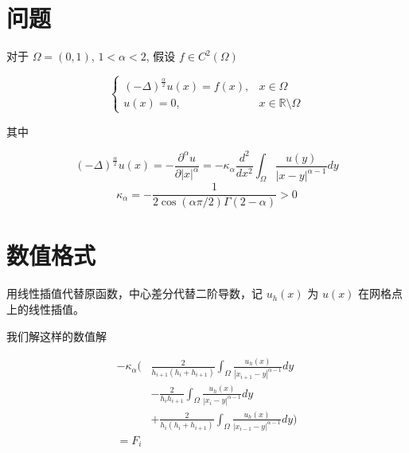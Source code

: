 \documentclass{ctexart}
\theoremstyle{definition}
\theoremstyle{remark}
\numberwithin{equation}{section}
\begin{document}
\section{问题}

对于 \(\Omega=(0,1)\), \(1<\alpha<2\), 假设 \(f\in C^2(\Omega)\)

\begin{equation}
    \begin{cases}
        (-\Delta)^{\frac{\alpha}{2}} u(x) = f(x), & x \in \Omega                      \\
        u(x) = 0,                                 & x \in \mathbb{R} \setminus \Omega
    \end{cases}
\end{equation}

其中

\begin{equation}
    (-\Delta)^{\frac{\alpha}{2}} u(x) = -\frac{\partial^\alpha u}{\partial |x|^\alpha}
    = -\kappa_\alpha \frac{d^2}{dx^2} \int_\Omega \frac{u(y)}{|x-y|^{\alpha-1}} dy
\end{equation}
\begin{equation}
    \kappa_\alpha = -\frac{1}{2\cos(\alpha\pi/2)\Gamma(2-\alpha)} > 0
\end{equation}

\section{数值格式}

用线性插值代替原函数，中心差分代替二阶导数，记 \(u_h(x)\) 为 \(u(x)\) 在网格点上的线性插值。

我们解这样的数值解

\begin{equation}
    \begin{aligned}
        -\kappa_\alpha ( & \frac{2}{h_{i+1} (h_i + h_{i+1})}\int_\Omega \frac{u_h(x)}{ |x_{i+1}-y|^{\alpha-1} } dy \\
              & -\frac{2}{h_i h_{i+1}}\int_\Omega \frac{u_h(x)}{ |x_i-y|^{\alpha-1} } dy                \\
              & + \frac{2}{h_i (h_i+ h_{i+1})}\int_\Omega \frac{u_h(x)}{ |x_{i-1}-y|^{\alpha-1} } dy
        )                                                                                               \\
        = F_i
    \end{aligned}
\end{equation}
\end{document}
